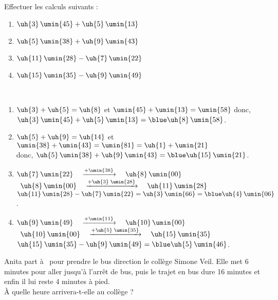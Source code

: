 \begin{colonne*exercice}
\bigskip


\begin{exercice} %
   Effectuer les calculs suivants :
   \begin{enumerate}
      \item $\uh{3}\,\umin{45}+\uh{5}\,\umin{13}$
      \item $\uh{5}\,\umin{38}+\uh{9}\,\umin{43}$
      \item $\uh{11}\,\umin{28}-\uh{7}\,\umin{22}$
      \item $\uh{15}\,\umin{35}-\uh{9}\,\umin{49}$
   \end{enumerate}
\end{exercice}

\begin{corrige}
   \ \\ [-5mm]
   \begin{enumerate}
      \item $\uh{3}+\uh{5} =\uh{8}$ et $\umin{45}+\umin{13} =\umin{58}$ donc, $\uh{3}\,\umin{45}+\uh{5}\,\umin{13} =\blue \uh{8}\,\umin{58}$.
      \item $\uh{5}+\uh{9} =\uh{14}$ et \\
         $\umin{38}+\umin{43} =\umin{81} =\uh{1}+\umin{21}$ \\
         donc, $\uh{5}\,\umin{38}+\uh{9}\,\umin{43} =\blue \uh{15}\,\umin{21}$.
      \item $\uh{7}\,\umin{22} \quad \xrightarrow{+\umin{38}} \quad \uh{8}\,\umin{00}$ \\
         \quad\, $\uh{8}\,\umin{00} \quad \xrightarrow{+\uh{3}\;  \umin{28}} \quad \uh{11}\,\umin{28}$ \\
         $\uh{11}\,\umin{28}-\uh{7}\,\umin{22} =\uh{3}\,\umin{66} =\blue \uh{4}\,\umin{06}$.
      \item $\uh{9}\,\umin{49} \quad \xrightarrow{+\umin{11}} \quad \uh{10}\,\umin{00}$ \\
         \quad\, $\uh{10}\,\umin{00} \quad \xrightarrow{+\uh{5} \; \umin{35}} \quad \uh{15}\,\umin{35}$ \\   
         $\uh{15}\,\umin{35}-\uh{9}\,\umin{49} =\blue \uh{5}\,\umin{46}$.
   \end{enumerate}
\end{corrige}

\bigskip


\begin{exercice} %
   Anita part à \, pour prendre le bus direction le collège Simone Veil. Elle met 6 minutes pour aller jusqu'à l'arrêt de bus, puis le trajet en bus dure 16 minutes et enfin il lui reste 4 minutes à pied. \\
   À quelle heure arrivera-t-elle au collège ?
\end{exercice}


\end{colonne*exercice}
